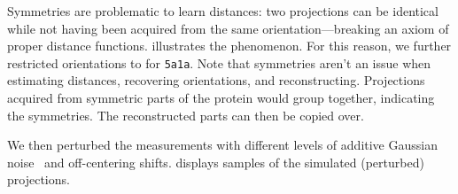 Symmetries are problematic to learn distances: two projections can be identical while not having been acquired from the same orientation---breaking an axiom of proper distance functions.
 illustrates the phenomenon.
For this reason, we further restricted orientations to  for \texttt{5a1a}.
Note that symmetries aren't an issue when estimating distances, recovering orientations, and reconstructing.
Projections acquired from symmetric parts of the protein would group together, indicating the symmetries.
The reconstructed parts can then be copied over.

We then perturbed the measurements with different levels of additive Gaussian noise~\cite{sorzano2004normalizing,shigematsu2013noise} and off-centering shifts. %
 displays samples of the simulated (perturbed) projections.

